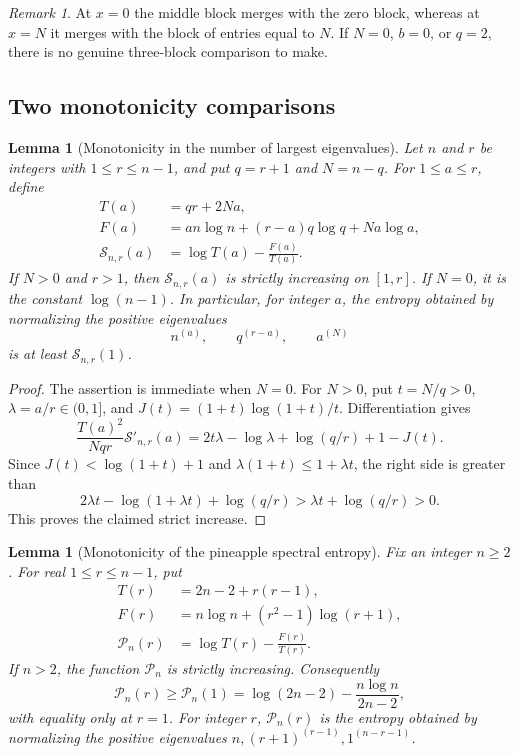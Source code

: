 \documentclass[11pt,a4paper,reqno]{amsart}
\newtheorem{lemma}[theorem]{Lemma}
\theoremstyle{remark}
\newtheorem{remark}[theorem]{Remark}
\numberwithin{equation}{section}
\begin{document}
\begin{remark}
At $x=0$ the middle block merges with the zero block, whereas at $x=N$
it merges with the block of entries equal to $N$. If $N=0$, $b=0$, or
$q=2$, there is no genuine three-block comparison to make.
\end{remark}

\subsection{Two monotonicity comparisons}\label{subsec:two-monotonicity-comparisons}

\begin{lemma}[Monotonicity in the number of largest eigenvalues]
\label{lem:two-level-a}
Let $n$ and $r$ be integers with $1\le r\le n-1$, and put
$q=r+1$ and $N=n-q$. For $1\le a\le r$, define
\begin{align*}
 T(a)&=qr+2Na,\\
 F(a)&=an\log n+(r-a)q\log q+Na\log a,\\
 \mathcal S_{n,r}(a)&=\log T(a)-\frac{F(a)}{T(a)}.
\end{align*}
If $N>0$ and $r>1$, then $\mathcal S_{n,r}(a)$ is strictly increasing
on $[1,r]$. If $N=0$, it is the constant $\log(n-1)$.
In particular, for integer $a$, the entropy obtained by normalizing
the positive eigenvalues
\[
 n^{(a)},\qquad q^{(r-a)},\qquad a^{(N)}
\]
is at least $\mathcal S_{n,r}(1)$.
\end{lemma}

\begin{proof}
The assertion is immediate when $N=0$. For $N>0$, put $t=N/q>0$,
$\lambda=a/r\in(0,1]$, and $J(t)=(1+t)\log(1+t)/t$.
Differentiation gives
\[
 \frac{T(a)^2}{Nqr}\mathcal S'_{n,r}(a)
 =2t\lambda-\log\lambda+\log(q/r)+1-J(t).
\]
Since $J(t)<\log(1+t)+1$ and $\lambda(1+t)\le1+\lambda t$, the right
side is greater than
\[
 2\lambda t-\log(1+\lambda t)+\log(q/r)
 >\lambda t+\log(q/r)>0.
\]
This proves the claimed strict increase.
\end{proof}

\begin{lemma}[Monotonicity of the pineapple spectral entropy]
\label{lem:pineapple-r}
Fix an integer $n\ge2$. For real $1\le r\le n-1$, put
\begin{align*}
 T(r)&=2n-2+r(r-1),\\
 F(r)&=n\log n+(r^2-1)\log(r+1),\\
 \mathcal P_n(r)&=\log T(r)-\frac{F(r)}{T(r)}.
\end{align*}
If $n>2$, the function $\mathcal P_n$ is strictly increasing. Consequently
\[
 \mathcal P_n(r)\ge\mathcal P_n(1)
 =\log(2n-2)-\frac{n\log n}{2n-2},
\]
with equality only at $r=1$.
For integer $r$, $\mathcal P_n(r)$ is the entropy obtained by normalizing
the positive eigenvalues
$n,(r+1)^{(r-1)},1^{(n-r-1)}$.
\end{lemma}
\end{document}
